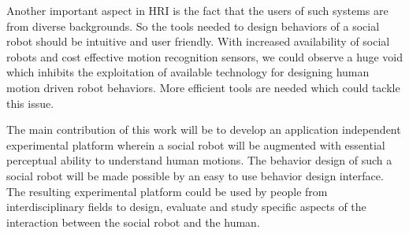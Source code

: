 \documentclass{llncs}
\begin{document}
Another important aspect in HRI is the fact that the users of such systems are from diverse backgrounds. So the tools needed to design behaviors of a social robot should be intuitive and user friendly.  With increased availability of social robots and cost effective motion recognition sensors, we could observe a huge void which inhibits the exploitation of available technology for designing human motion driven robot behaviors. More efficient tools are needed which could tackle this issue.

The main contribution of this work will be to develop an application independent experimental platform wherein a social robot will be augmented with essential perceptual ability to understand human motions. The behavior design of such a social robot will be made possible by an easy to use behavior design interface. The resulting experimental platform could be used by people from interdisciplinary fields to design, evaluate and study specific aspects of the interaction between the social robot and the human.
%
%
\end{document}

